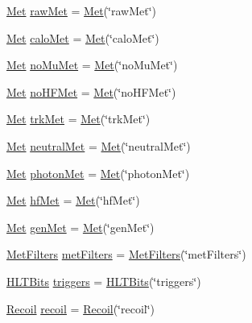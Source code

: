 \begin{DoxyCompactItemize}
\item 
\hyperlink{classpanda_1_1Met}{Met} \hyperlink{classpanda_1_1Event_a860a1e91138f7c8763664d174f2d5e8c}{rawMet} = \hyperlink{classpanda_1_1Met}{Met}(\char`\"{}rawMet\char`\"{})
\item 
\hyperlink{classpanda_1_1Met}{Met} \hyperlink{classpanda_1_1Event_a15d30ed2e140f6f5bb8fd5a96737f129}{caloMet} = \hyperlink{classpanda_1_1Met}{Met}(\char`\"{}caloMet\char`\"{})
\item 
\hyperlink{classpanda_1_1Met}{Met} \hyperlink{classpanda_1_1Event_a6b92c63f4fe3a3b7025884f3693c415f}{noMuMet} = \hyperlink{classpanda_1_1Met}{Met}(\char`\"{}noMuMet\char`\"{})
\item 
\hyperlink{classpanda_1_1Met}{Met} \hyperlink{classpanda_1_1Event_aef6c4ad7a43f8bba87e0ed0c9cf38fbe}{noHFMet} = \hyperlink{classpanda_1_1Met}{Met}(\char`\"{}noHFMet\char`\"{})
\item 
\hyperlink{classpanda_1_1Met}{Met} \hyperlink{classpanda_1_1Event_a4fb679e95824515627bc4665b39ba7f2}{trkMet} = \hyperlink{classpanda_1_1Met}{Met}(\char`\"{}trkMet\char`\"{})
\item 
\hyperlink{classpanda_1_1Met}{Met} \hyperlink{classpanda_1_1Event_a122944fe3d7433466f448a37274752fa}{neutralMet} = \hyperlink{classpanda_1_1Met}{Met}(\char`\"{}neutralMet\char`\"{})
\item 
\hyperlink{classpanda_1_1Met}{Met} \hyperlink{classpanda_1_1Event_ad7826ab4d968d82a8390ef07b6a3f63d}{photonMet} = \hyperlink{classpanda_1_1Met}{Met}(\char`\"{}photonMet\char`\"{})
\item 
\hyperlink{classpanda_1_1Met}{Met} \hyperlink{classpanda_1_1Event_acc4184933eb9ecfa7e7f9bcd2d8fff1a}{hfMet} = \hyperlink{classpanda_1_1Met}{Met}(\char`\"{}hfMet\char`\"{})
\item 
\hyperlink{classpanda_1_1Met}{Met} \hyperlink{classpanda_1_1Event_a2a2b92638c18227eac196b49b45f93dd}{genMet} = \hyperlink{classpanda_1_1Met}{Met}(\char`\"{}genMet\char`\"{})
\item 
\hyperlink{classpanda_1_1MetFilters}{MetFilters} \hyperlink{classpanda_1_1Event_a45127567818ae586be29240c817cbe37}{metFilters} = \hyperlink{classpanda_1_1MetFilters}{MetFilters}(\char`\"{}metFilters\char`\"{})
\item 
\hyperlink{classpanda_1_1HLTBits}{HLTBits} \hyperlink{classpanda_1_1Event_ab9d5a4256dc7589d57ea44924e961162}{triggers} = \hyperlink{classpanda_1_1HLTBits}{HLTBits}(\char`\"{}triggers\char`\"{})
\item 
\hyperlink{classpanda_1_1Recoil}{Recoil} \hyperlink{classpanda_1_1Event_a8a6a46e16c3efe1f5a73d105228927f8}{recoil} = \hyperlink{classpanda_1_1Recoil}{Recoil}(\char`\"{}recoil\char`\"{})
\end{DoxyCompactItemize}
